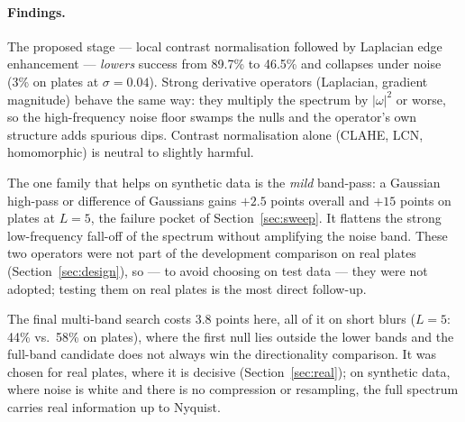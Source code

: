 \paragraph{Findings.} The proposed stage --- local contrast normalisation followed by Laplacian edge
enhancement --- \emph{lowers} success from 89.7\% to 46.5\% and collapses under noise (3\% on
plates at $\sigma=0.04$). Strong derivative operators (Laplacian, gradient magnitude) behave the
same way: they multiply the spectrum by $|\omega|^2$ or worse, so the high-frequency noise floor
swamps the nulls and the operator's own structure adds spurious dips. Contrast normalisation alone
(CLAHE, LCN, homomorphic) is neutral to slightly harmful.

The one family that helps on synthetic data is the \emph{mild} band-pass: a Gaussian high-pass or
difference of Gaussians gains $+2.5$ points overall and $+15$ points on plates at $L=5$, the
failure pocket of Section~\ref{sec:sweep}. It flattens the strong low-frequency fall-off of the
spectrum without amplifying the noise band. These two operators were not part of the
development comparison on real plates (Section~\ref{sec:design}), so --- to avoid choosing on
test data --- they were not adopted; testing them on real plates is the most direct follow-up.

The final multi-band search costs 3.8 points here, all of it on short blurs ($L=5$: 44\% vs.\
58\% on plates), where the first null lies outside the lower bands and the full-band candidate
does not always win the directionality comparison. It was chosen for real plates, where it is
decisive (Section~\ref{sec:real}); on synthetic data, where noise is white and there is no
compression or resampling, the full spectrum carries real information up to Nyquist.
